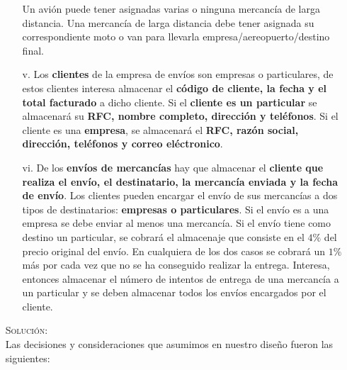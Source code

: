 \documentclass[letterpaper,11pt]{article}
\begin{document}
\begin{itemize}
\begin{itemize}
        Un avión puede tener asignadas varias o ninguna mercancía de larga distancia.
        Una mercancía de larga distancia debe tener asignada su correspondiente moto
        o van para llevarla empresa/aereopuerto/destino final.

        \item[v.] Los \textbf{clientes} de la empresa de envíos son empresas o
        particulares, de estos clientes interesa almacenar el \textbf{código de
        cliente, la fecha y el total facturado} a dicho cliente. Si el
        \textbf{cliente es un particular} se almacenará su \textbf{RFC, nombre
        completo, dirección y teléfonos}. Si el cliente es una \textbf{empresa}, se
        almacenará el \textbf{RFC, razón social, dirección, teléfonos y correo
        eléctronico}.

        \item[vi.] De los \textbf{envíos de mercancías} hay que almacenar el
        \textbf{cliente que realiza el envío, el destinatario, la mercancía
        enviada y la fecha de envío}. Los clientes pueden encargar el envío de
        sus mercancías a dos tipos de destinatarios: \textbf{empresas o
        particulares}. Si el envío es a una empresa se debe enviar al menos una
        mercancía. Si el envío tiene como destino un particular, se cobrará el
        almacenaje que consiste en el $4 \%$ del precio original del envío. En
        cualquiera de los dos casos se cobrará un $1 \%$ más por cada vez que no
        se ha conseguido realizar la entrega. Interesa, entonces almacenar el
        número de intentos de entrega de una mercancía a un particular y se
        deben almacenar todos los envíos encargados por el cliente.
    \end{itemize}

\textsc{Solución:}\\
Las decisiones y consideraciones que asumimos en nuestro diseño fueron las siguientes:


\end{itemize}
\end{document}
